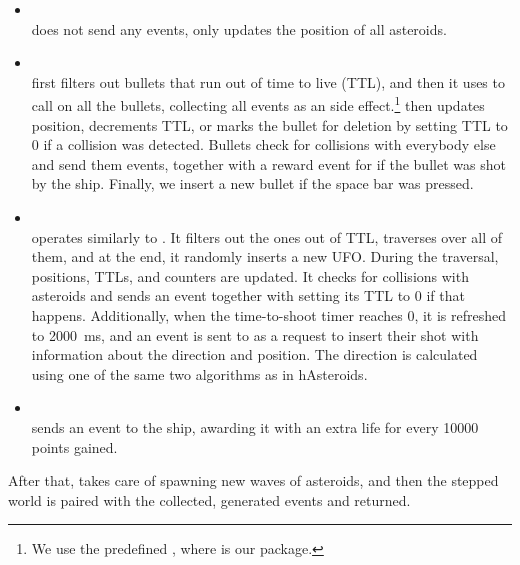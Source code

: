 \documentclass[
  digital, %
  color,   %
  table,   %
  oneside, %
  lof,     %
  lot,     %
]{fithesis3}
\begin{document}
{\begin{itemize}[--]
    \item {}\\
    does not send any events, only updates the position of all asteroids.

    \item {}\\
    first filters out bullets that run out of time to live (TTL), and then it uses 
    to call  on all the bullets, collecting all events as an
     side effect.\footnote{
    We use the predefined ,
    where  is our  package.}
     then updates position, decrements TTL, or marks the bullet for
    deletion by setting TTL to 0 if a collision was detected. Bullets check for collisions
    with everybody else and send them events, together with a reward event for 
    if the bullet was shot by the ship.
    Finally, we insert a new bullet if the space bar was pressed.

    \item {}\\
    operates similarly to . It filters out the ones out of TTL,
    traverses over all of them, and at the end, it randomly inserts a new UFO.
    During the traversal, positions, TTLs, and  counters are updated.
    It checks for collisions with asteroids and sends an event together with setting its TTL
    to 0 if that happens. Additionally, when the time-to-shoot timer reaches 0, it is refreshed
    to 2000~ms, and an event is sent to  as a request to insert their shot
    with information about the direction and position. The direction is calculated using
    one of the same two algorithms as in hAsteroids.

    \item {}\\
    sends an event to the ship, awarding it with an extra life for every 10\thinspace{}000 points gained.
\end{itemize}
After that,  takes care of spawning new waves of asteroids,
and then the stepped world is paired with the collected, generated events and returned.

}
\end{document}

